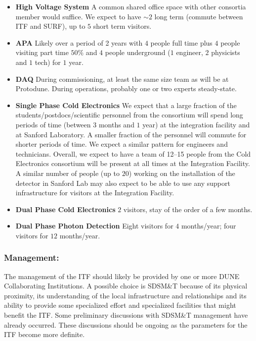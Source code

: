 \begin{itemize}
  \item {\bf High Voltage System} A common shared office space with other consortia member 
would suffice. We expect to have $\sim2$ long term (commute between ITF and SURF),
 up to $5$ short term visitors.
  \item {\bf APA} Likely over a period of 2 years with $4$ people full time plus $4$ people visiting 
part time $50\%$ and $4$ people underground ($1$ engineer, $2$ physicists and $1$ tech) for
 $1$ year.
  \item {\bf DAQ} During commissioning, at least the same size team as will be at Protodune. 
 During operations, probably one or two experts steady-state.
  \item {\bf Single Phase Cold Electronics} We expect that a large
    fraction of the students/postdocs/scientific personnel from the
    consortium will spend long periods of time (between $3$ months and
    $1$ year) at the integration facility and at Sanford Laboratory. A
    smaller fraction of the personnel will commute for shorter periods
    of time. We expect a similar pattern for engineers and
    technicians. Overall, we expect to have a team of 12--15 people
    from the Cold Electronics consortium will be present at all times
    at the Integration Facility. A similar number of people (up to
    $20$) working on the installation of the detector in Sanford Lab
    may also expect to be able to use any support infrastructure for
    visitors at the Integration Facility.
  \item {\bf Dual Phase Cold Electronics} $2$ visitors, stay of the order of a few months.
  \item {\bf Dual Phase Photon Detection} Eight visitors for $4$ months/year; 
four visitors for $12$ months/year.
\end{itemize}


\subsubsection{Management:}
The management of the ITF should likely be provided by one or more
DUNE Collaborating Institutions. A possible choice is SDSM\&T because
of its physical proximity, its understanding of the local
infrastructure and relationships and its ability to provide some
specialized effort and specialized facilities that might benefit
the ITF.  Some preliminary discussions with SDSM\&T management
have already occurred. These discussions should be ongoing as the
parameters for the ITF become more definite.


